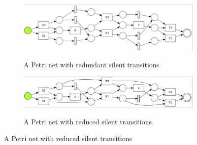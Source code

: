 \begin{figure}[!h]
	\centering
	\begin{subfigure}[a]{\textwidth}
		\includegraphics[width=\textwidth]{figures/algorithm/dfg-IM-pn-with-lt.png}
		\label{fig:with-lt}
		\caption{A Petri net with redundant silent transitions}
	\end{subfigure}
	\hfill
	\begin{subfigure}[b]{\textwidth}
		\centering
		\includegraphics[width=\linewidth]{figures/algorithm/dfg-IM-pn-with-lt-reduced.png}
		\label{fig:reduced-lt}
		\caption{A Petri net with reduced silent transitions}
	\end{subfigure}
\end{figure}


